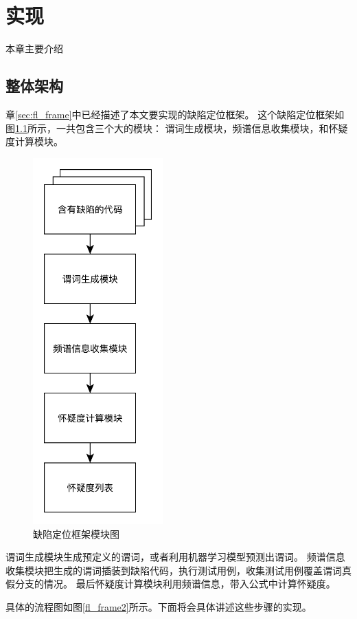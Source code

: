 \chapter{实现}

本章主要介绍

\section{整体架构}

章\ref{sec:fl_frame}中已经描述了本文要实现的缺陷定位框架。
这个缺陷定位框架如图\ref{fl_frame1}所示，一共包含三个大的模块：
谓词生成模块，频谱信息收集模块，和怀疑度计算模块。
\begin{figure}[htbp] 
\centering 
\includegraphics[width=5cm]{frame1} 
\caption{缺陷定位框架模块图} 
\label{fl_frame1}
\end{figure}

谓词生成模块生成预定义的谓词，或者利用机器学习模型预测出谓词。
频谱信息收集模块把生成的谓词插装到缺陷代码，执行测试用例，收集测试用例覆盖谓词真假分支的情况。
最后怀疑度计算模块利用频谱信息，带入公式中计算怀疑度。

具体的流程图如图\ref{fl_frame2}所示。下面将会具体讲述这些步骤的实现。


